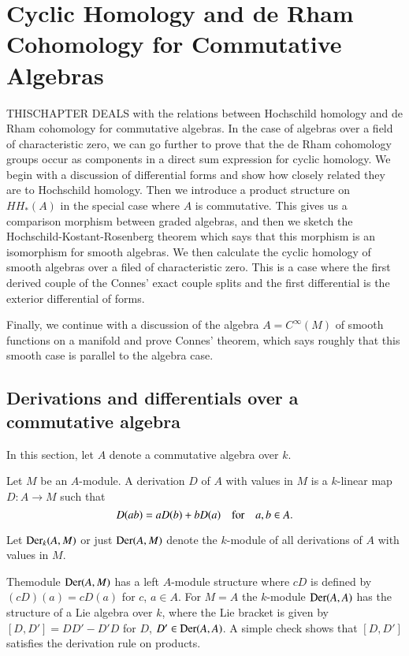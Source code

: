 \chapter[Cyclic Homology and de Rham Cohomology for...]{Cyclic
  Homology and de Rham Cohomology for Commutative 
  Algebras}\label{chap6} 

THIS\pageoriginale CHAPTER DEALS with the relations between Hochschild
homology and de Rham cohomology for commutative algebras. In the case
of algebras over a field of characteristic zero, we can go further to
prove that the de Rham cohomology groups occur as components in a
direct sum expression for cyclic homology. We begin with a discussion
of differential forms and show how closely related they are to
Hochschild homology. Then we introduce a product structure on
$HH_{\ast}(A)$ in the special case where $A$ is commutative. This
gives us a comparison morphism between graded algebras, and then we
sketch the Hochschild-Kostant-Rosenberg theorem which says that this
morphism is an isomorphism for smooth algebras. We then calculate the
cyclic homology of smooth algebras over a filed of characteristic
zero. This is a case where the first derived couple of the Connes'
exact couple splits and the first differential is the exterior
differential of forms.

Finally, we continue with a discussion of the algebra
$A=C^{\infty}(M)$ of smooth functions on a manifold and prove Connes'
theorem, which says roughly that this smooth case is parallel to the
algebra case.

\section{Derivations and differentials over a commutative
  algebra}\label{chap6-sec1}

In this section, let $A$ denote a commutative algebra over $k$.

\begin{definition}\label{chap6-defi1.1}
Let $M$ be an $A$-module. A derivation $D$ of $A$ with values in $M$
is a $k$-linear map $D:A\to M$ such that
$$
D(ab)=aD(b)+bD(a)\quad\text{for}\quad a,b\in A.
$$

Let $\operatorname{Der}_{k}(A,M)$ or just $\operatorname{Der}(A,M)$ denote the $k$-module of all
derivations of $A$ with values in $M$.
\end{definition}

The\pageoriginale module $\operatorname{Der}(A,M)$ has a left $A$-module structure
where $cD$ is defined by $(cD)(a)=cD(a)$ for $c$, $a\in A$. For $M=A$
the $k$-module $\operatorname{Der}(A,A)$ has the structure of a Lie algebra over
$k$, where the Lie bracket is given by $[D,D']=DD'-D'D$ for $D$,
$D'\in \operatorname{Der}(A,A)$. A simple check shows that $[D,D']$ satisfies the
derivation rule on products.

